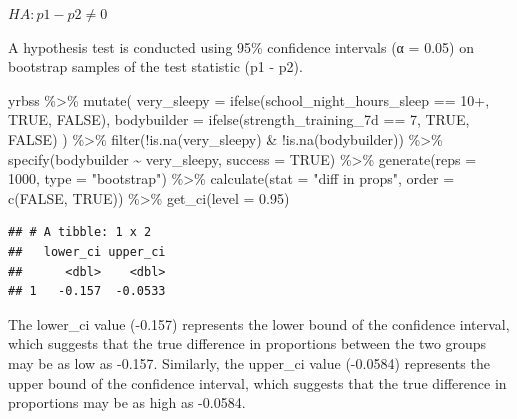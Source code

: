 \documentclass[
]{article}
\newenvironment{Shaded}{\begin{snugshade}}{\end{snugshade}}
\newcommand{\AttributeTok}[1]{\textcolor[rgb]{0.77,0.63,0.00}{#1}}
\newcommand{\ConstantTok}[1]{\textcolor[rgb]{0.00,0.00,0.00}{#1}}
\newcommand{\DecValTok}[1]{\textcolor[rgb]{0.00,0.00,0.81}{#1}}
\newcommand{\FloatTok}[1]{\textcolor[rgb]{0.00,0.00,0.81}{#1}}
\newcommand{\FunctionTok}[1]{\textcolor[rgb]{0.00,0.00,0.00}{#1}}
\newcommand{\NormalTok}[1]{#1}
\newcommand{\SpecialCharTok}[1]{\textcolor[rgb]{0.00,0.00,0.00}{#1}}
\newcommand{\StringTok}[1]{\textcolor[rgb]{0.31,0.60,0.02}{#1}}
\begin{document}
\(HA: p1 - p2 ≠ 0\)

A hypothesis test is conducted using 95\% confidence intervals (α =
0.05) on bootstrap samples of the test statistic (p1 - p2).

\begin{Shaded}
\begin{Highlighting}[]
\NormalTok{yrbss }\SpecialCharTok{\%\textgreater{}\%}
  \FunctionTok{mutate}\NormalTok{(}
    \AttributeTok{very\_sleepy =} \FunctionTok{ifelse}\NormalTok{(school\_night\_hours\_sleep }\SpecialCharTok{==} \StringTok{\textquotesingle{}10+\textquotesingle{}}\NormalTok{, }\ConstantTok{TRUE}\NormalTok{, }\ConstantTok{FALSE}\NormalTok{),}
    \AttributeTok{bodybuilder =} \FunctionTok{ifelse}\NormalTok{(strength\_training\_7d }\SpecialCharTok{==} \StringTok{\textquotesingle{}7\textquotesingle{}}\NormalTok{, }\ConstantTok{TRUE}\NormalTok{, }\ConstantTok{FALSE}\NormalTok{)       }
\NormalTok{  ) }\SpecialCharTok{\%\textgreater{}\%}
  \FunctionTok{filter}\NormalTok{(}\SpecialCharTok{!}\FunctionTok{is.na}\NormalTok{(very\_sleepy) }\SpecialCharTok{\&} \SpecialCharTok{!}\FunctionTok{is.na}\NormalTok{(bodybuilder)) }\SpecialCharTok{\%\textgreater{}\%}
    \FunctionTok{specify}\NormalTok{(bodybuilder }\SpecialCharTok{\textasciitilde{}}\NormalTok{ very\_sleepy, }\AttributeTok{success =} \StringTok{\textquotesingle{}TRUE\textquotesingle{}}\NormalTok{) }\SpecialCharTok{\%\textgreater{}\%}
    \FunctionTok{generate}\NormalTok{(}\AttributeTok{reps =} \DecValTok{1000}\NormalTok{, }\AttributeTok{type =} \StringTok{"bootstrap"}\NormalTok{) }\SpecialCharTok{\%\textgreater{}\%}
    \FunctionTok{calculate}\NormalTok{(}\AttributeTok{stat =} \StringTok{"diff in props"}\NormalTok{, }\AttributeTok{order =} \FunctionTok{c}\NormalTok{(}\StringTok{\textquotesingle{}FALSE\textquotesingle{}}\NormalTok{, }\StringTok{\textquotesingle{}TRUE\textquotesingle{}}\NormalTok{)) }\SpecialCharTok{\%\textgreater{}\%}
    \FunctionTok{get\_ci}\NormalTok{(}\AttributeTok{level =} \FloatTok{0.95}\NormalTok{)}
\end{Highlighting}
\end{Shaded}

\begin{verbatim}
## # A tibble: 1 x 2
##   lower_ci upper_ci
##      <dbl>    <dbl>
## 1   -0.157  -0.0533
\end{verbatim}

The lower\_ci value (-0.157) represents the lower bound of the
confidence interval, which suggests that the true difference in
proportions between the two groups may be as low as -0.157. Similarly,
the upper\_ci value (-0.0584) represents the upper bound of the
confidence interval, which suggests that the true difference in
proportions may be as high as -0.0584.
\end{document}
